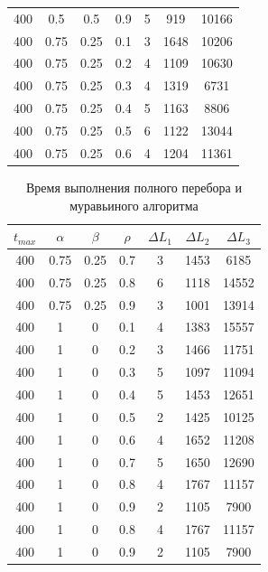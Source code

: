 \documentclass[12pt]{report}
\begin{document}
\begin{table}[H]
\begin{center}
\begin{tabular}{|c|c|c|c|c|c|c|}
				400 & 0.5 & 0.5 & 0.9 & 5 & 919 & 10166 \\
				400 & 0.75 & 0.25 & 0.1 & 3 & 1648 & 10206 \\
				400 & 0.75 & 0.25 & 0.2 & 4 & 1109 & 10630 \\
				400 & 0.75 & 0.25 & 0.3 & 4 & 1319 & 6731 \\
				400 & 0.75 & 0.25 & 0.4 & 5 & 1163 & 8806 \\
				400 & 0.75 & 0.25 & 0.5 & 6 & 1122 & 13044 \\
				400 & 0.75 & 0.25 & 0.6 & 4 & 1204 & 11361 \\
				\hline 	
			\end{tabular}
		\end{center}
	\end{table}
	\newpage
	\begin{table}[H]
		\begin{center}
			\caption[]{\label{tbl:only12} Время выполнения полного перебора и муравьиного алгоритма}
			\begin{tabular}{|c|c|c|c|c|c|c|}
				\hline
				$t_{max}$ & $\alpha$ & $\beta$ & $\rho$ & $\Delta L_{1}$ & $\Delta L_{2}$ & $\Delta L_{3}$\\
				\hline			
				400 & 0.75 & 0.25 & 0.7 & 3 & 1453 & 6185 \\
				400 & 0.75 & 0.25 & 0.8 & 6 & 1118 & 14552 \\
				400 & 0.75 & 0.25 & 0.9 & 3 & 1001 & 13914 \\
				400 & 1 & 0 & 0.1 & 4 & 1383 & 15557 \\
				400 & 1 & 0 & 0.2 & 3 & 1466 & 11751 \\
				400 & 1 & 0 & 0.3 & 5 & 1097 & 11094 \\
				400 & 1 & 0 & 0.4 & 5 & 1453 & 12651 \\
				400 & 1 & 0 & 0.5 & 2 & 1425 & 10125 \\
				400 & 1 & 0 & 0.6 & 4 & 1652 & 11208 \\
				400 & 1 & 0 & 0.7 & 5 & 1650 & 12690 \\
				400 & 1 & 0 & 0.8 & 4 & 1767 & 11157 \\
				400 & 1 & 0 & 0.9 & 2 & 1105 & 7900 \\
				400 & 1 & 0 & 0.8 & 4 & 1767 & 11157 \\
				400 & 1 & 0 & 0.9 & 2 & 1105 & 7900 \\
				\hline 	
			\end{tabular}
		\end{center}
	\end{table}
\end{document}
